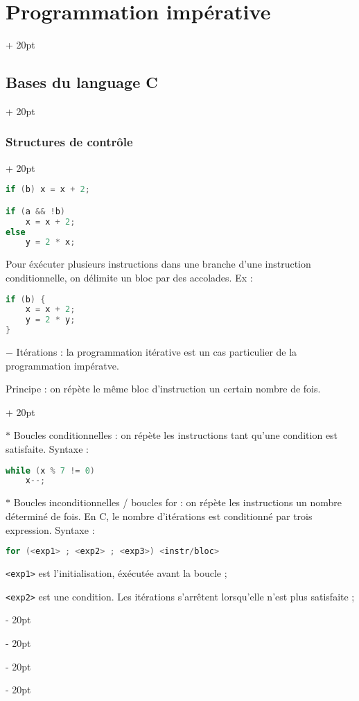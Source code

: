 \documentclass[a4paper, 12pt, twoside]{article}
\newcommand{\ind}[1][20pt]{\advance\leftskip + #1}
\newcommand{\deind}[1][20pt]{\advance\leftskip - #1}
\newenvironment{indentedenv}[1][20pt]{\par \ind[#1]}{\par \deind}
\newenvironment{indt}[2][20pt]{#2 \begin{indentedenv}[#1]}{\end{indentedenv}} %
\begin{document}
\begin{indt}{\section{Programmation impérative}}
\begin{indt}{\subsection{Bases du language C}}
\begin{indt}{\subsubsection{Structures de contrôle}}
                    \begin{lstlisting}[language=C, xleftmargin=80pt]
if (b) x = x + 2;

if (a && !b)
    x = x + 2;
else
    y = 2 * x;
                    \end{lstlisting}
                
                Pour éxécuter plusieurs instructions dans une branche d'une instruction conditionnelle, on délimite un bloc par des accolades.
                Ex :
                    
                    \begin{lstlisting}[language=C, xleftmargin=80pt]
if (b) {
    x = x + 2;
    y = 2 * y;
}\end{lstlisting}
                
                \vspace{6pt}
                
                \begin{indt}{$-$ Itérations : la programmation itérative est un cas particulier de la programmation impératve.
                
                Principe : on répète le même bloc d'instruction un certain nombre de fois.}
                    
                    $*$ Boucles conditionnelles : on répète les instructions tant qu'une condition est satisfaite. Syntaxe :
                    
                    \begin{lstlisting}[language=C, xleftmargin=100pt]
while (x % 7 != 0)
    x--;\end{lstlisting}
                    
                    \vspace{6pt}
                    
                    $*$ Boucles inconditionnelles / boucles for : on répète les instructions un nombre déterminé de fois. En C, le nombre d'itérations est conditionné par trois expression. Syntaxe :
                    
                    \begin{lstlisting}[language=C, xleftmargin=100pt]
for (<exp1> ; <exp2> ; <exp3>) <instr/bloc>\end{lstlisting}
                    
                    \texttt{<exp1>} est l'initialisation, éxécutée avant la boucle ;
                    
                    \texttt{<exp2>} est une condition. Les itérations s'arrêtent lorsqu'elle n'est plus satisfaite ;


\end{indt}
\end{indt}
\end{indt}
\end{indt}
\end{document}
